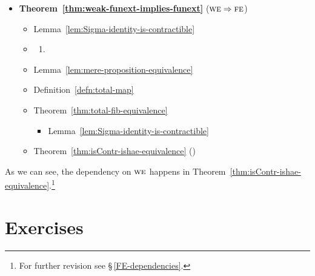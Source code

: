 \begin{rem}
{
\begin{itemize}[label=$\blacklozenge$]
    \item \textbf{Theorem~\ref{thm:weak-funext-implies-funext}}
        ($\text{\upshape\textsc{we}}\Rightarrow\text{\upshape\textsc{fe}}$)
    \begin{itemize}[label=$\triangleright$]
        \item Lemma~\ref{lem:Sigma-identity-is-contractible}
        \item {}
        \begin{enumerate}[label=$\scriptstyle\bullet$]
                        \item {}
        \end{enumerate}
        \item Lemma~\ref{lem:mere-proposition-equivalence}
        \item Definition~\ref{defn:total-map}
        \item Theorem~\ref{thm:total-fib-equivalence}
        \begin{itemize}[$\circ$]
            \item Lemma~\ref{lem:Sigma-identity-is-contractible}
        \end{itemize}
        \item Theorem~\ref{thm:isContr-ishae-equivalence} (\WE)
    \end{itemize}
\end{itemize}
As we can see, the dependency on $\text{\upshape\textsc{we}}$ happens in Theorem~\ref{thm:isContr-ishae-equivalence}.\footnote{For further revision see \S\,\ref{FE-dependencies}.}
}
\end{rem}


\section{Exercises}

